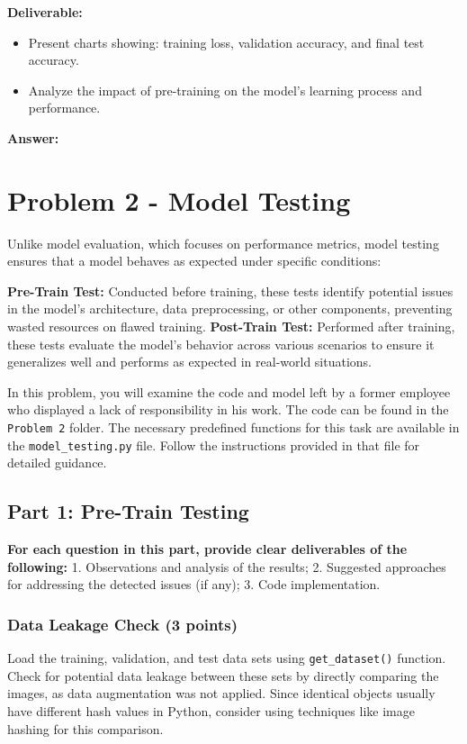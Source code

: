 \documentclass[11pt, oneside]{article}   	%
\begin{document}
\noindent\textbf{Deliverable:}
\begin{itemize}
    \item Present charts showing: training loss, validation accuracy, and final test accuracy.
    \item Analyze the impact of pre-training on the model's learning process and performance.
    
\end{itemize}

\textbf{Answer:} \\



\section*{Problem 2 - Model Testing}
Unlike model evaluation, which focuses on performance metrics, model testing ensures that a model behaves as expected under specific conditions:

\noindent \textbf{Pre-Train Test:} Conducted before training, these tests identify potential issues in the model's architecture, data preprocessing, or other components, preventing wasted resources on flawed training.
 \textbf{Post-Train Test:} Performed after training, these tests evaluate the model's behavior across various scenarios to ensure it generalizes well and performs as expected in real-world situations.

In this problem, you will examine the code and model left by a former employee who displayed a lack of responsibility in his work. The code can be found in the \texttt{Problem 2} folder. The necessary predefined functions for this task are available in the \texttt{model\_testing.py} file. Follow the instructions provided in that file for detailed guidance.

\subsection*{Part 1: Pre-Train Testing}

\textbf{For each question in this part, provide clear deliverables of the following:} 1. Observations and analysis of the results; 2. Suggested approaches for addressing the detected issues (if any); 3. Code implementation.

\subsubsection*{Data Leakage Check (3 points)}
Load the training, validation, and test data sets using \texttt{get\_dataset()} function. Check for potential data leakage between these sets by directly comparing the images, as data augmentation was not applied. Since identical objects usually have different hash values in Python, consider using techniques like image hashing for this comparison.
\end{document}
